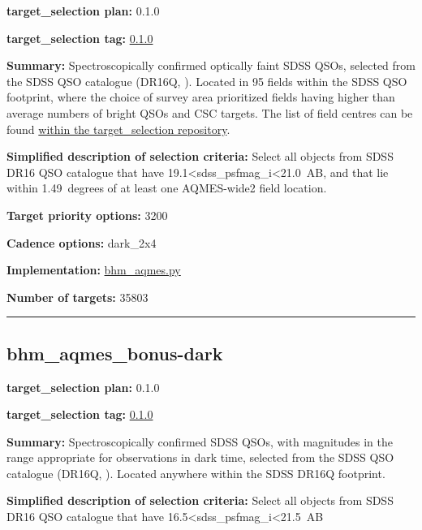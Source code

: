 \noindent\textbf{target\_selection plan:} 0.1.0

\noindent\textbf{target\_selection tag:}
\href{https://github.com/sdss/target_selection/tree/0.1.0/}{0.1.0}

\noindent\textbf{Summary:} Spectroscopically confirmed optically faint SDSS QSOs,
selected from the SDSS QSO catalogue (DR16Q,
\citealt{Lyke2020}). Located in 95 fields within the SDSS QSO footprint,
where the choice of survey area prioritized fields having higher than
average numbers of bright QSOs and CSC targets. The list of field
centres can be found
\href{https://github.com/sdss/target_selection/blob/0.1.0/python/target_selection/masks/candidate_target_fields_bhm_aqmes_wide_v0.2.1.fits}{within
the target\_selection repository}.

\noindent\textbf{Simplified description of selection criteria:} Select all
objects from SDSS DR16 QSO catalogue that have
19.1\textless sdss\_psfmag\_i\textless21.0~AB, and that lie within
1.49~degrees of at least one AQMES-wide2 field location.


\noindent\textbf{Target priority options:} 3200

\noindent\textbf{Cadence options:} dark\_2x4

\noindent\textbf{Implementation:}
\href{https://github.com/sdss/target_selection/blob/0.1.0/python/target_selection/cartons/bhm_aqmes.py}{bhm\_aqmes.py}

\noindent\textbf{Number of targets:} 35803

\begin{center}\rule{0.5\linewidth}{0.5pt}\end{center}

\hypertarget{bhm_aqmes_bonus-dark_plan0.1.0}{%
\subsection{bhm\_aqmes\_bonus-dark}\label{bhm_aqmes_bonus-dark_plan0.1.0}}

\noindent\textbf{target\_selection plan:} 0.1.0

\noindent\textbf{target\_selection tag:}
\href{https://github.com/sdss/target_selection/tree/0.1.0/}{0.1.0}

\noindent\textbf{Summary:} Spectroscopically confirmed SDSS QSOs, with magnitudes
in the range appropriate for observations in dark time, selected from
the SDSS QSO catalogue (DR16Q,
\citealt{Lyke2020}). Located anywhere within the SDSS DR16Q footprint.

\noindent\textbf{Simplified description of selection criteria:} Select all
objects from SDSS DR16 QSO catalogue that have
16.5\textless sdss\_psfmag\_i\textless21.5~AB


